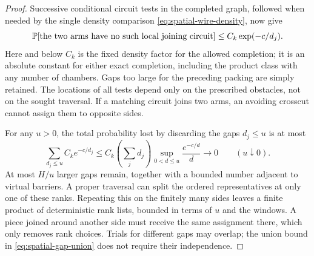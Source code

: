 \begin{proof}
Successive conditional circuit tests in the completed graph, followed
when needed by the single density comparison
\eqref{eq:spatial-wire-density}, now give
\begin{equation}\label{eq:spatial-gap-failure}
 \P[\text{the two arms have no such local joining circuit}]
                  \le C_k\exp(-c/d_j).
\end{equation}
Here and below $C_k$ is the fixed density factor for the allowed
completion; it is an absolute constant for either exact completion,
including the product class with any number of chambers.
Gaps too large for the preceding packing are simply retained. The
locations of all tests depend only on the prescribed obstacles, not
on the sought traversal. If a matching circuit joins two arms, an
avoiding crosscut cannot assign them to opposite sides.

For any $u>0$, the total probability lost by discarding the gaps
$d_j\le u$ is at most
\begin{equation}\label{eq:spatial-gap-union}
 \sum_{d_j\le u} C_k e^{-c/d_j}
 \le C_k\left(\sum_jd_j\right)
          \sup_{0<d\le u}\frac{e^{-c/d}}{d}
 \longrightarrow0\qquad(u\downarrow0).
\end{equation}
At most $H/u$ larger gaps remain, together with a bounded number
adjacent to virtual barriers. A proper traversal can split the
ordered representatives at only one of these ranks. Repeating this
on the finitely many sides leaves a finite product of deterministic
rank lists, bounded in terms of $u$ and the windows. A piece joined
around another side must receive the same assignment there, which
only removes rank choices. Trials for different gaps may overlap;
the union bound in \eqref{eq:spatial-gap-union} does not require their
independence.


\end{proof}

